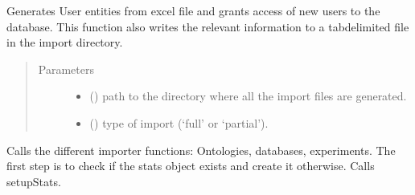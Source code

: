 \documentclass[letterpaper,10pt,english]{sphinxmanual}
\begin{document}
\begin{fulllineitems}
\label{\detokenize{_autosummary/graphdb_builder.builder:graphdb_builder.builder.importer.usersImport}}
Generates User entities from excel file and grants access of new users to the database.
This function also writes the relevant information to a tab\sphinxhyphen{}delimited file in the import     directory.
\begin{quote}\begin{description}
\item[{Parameters}] \leavevmode\begin{itemize}
\item {} 
 () \textendash{} path to the directory where all the import files are generated.

\item {} 
 () \textendash{} type of import (‘full’ or ‘partial’).

\end{itemize}

\end{description}\end{quote}

\end{fulllineitems}


\begin{fulllineitems}
\label{\detokenize{_autosummary/graphdb_builder.builder:graphdb_builder.builder.importer.fullImport}}
Calls the different importer functions: Ontologies, databases,     experiments. The first step is to check if the stats object exists     and create it otherwise. Calls setupStats.

\end{fulllineitems}
\end{document}

